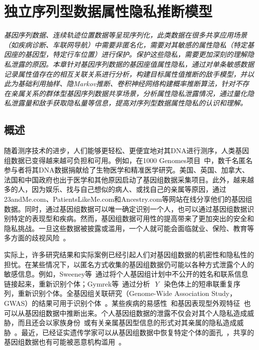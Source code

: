 \chapter{独立序列型数据属性隐私推断模型}
\label{chap:inference-attack-on-norelated-sequenced-data}

\textit{ }

\textit{基因序列数据、连续轨迹位置数据等呈现序列化，此类数据在很多共享应用场景（如疾病诊断、车联网导航）中需要非匿名化，需要对其敏感的属性隐私（特定基因座的基因型，特定行车位置）进行保护。保护这些隐私，需要更加深刻的理解隐私泄露的原因。本章针对基因序列数据的基因座值属性隐私，通过对单条敏感数据记录属性值存在的相互关联关系进行分析，构建目标属性值推断的敌手模型，并以此为基础利用抽样、隐Markov推断、卷积神经网络构建概率推断算法，针对不存在亲属关系的群体型基因序列数据共享场景，分析属性隐私泄露情况，通过量化隐私泄露量和敌手获取隐私量等信息，提高对序列型数据属性隐私的认识和理解。
}

\section{概述}\label{sec:intro}

随着测序技术的进步，人们能够更轻松、更便宜地对其DNA进行测序，人类基因组数据已变得越来越可负担和可用。例如，在1000 Genomes项目~\cite{gpc2015global}中，数千名匿名参与者将其DNA数据捐献给了生物医学和精准医学研究。美国、英国、加拿大、法国和中国政府也出于医学和其他原因启动了基因组数据采集项目。此外，越来越多的人，因为娱乐、找与自己想似的病人、或找自己的亲属等原因，通过23andMe.com、PatientsLikeMe.com和Ancestry.com等网站在线分享他们的基因组数据。同时，通过基因组数据可以唯一确定识别一个人，也可以通过基因组数据识别特定的表现型和疾病。然而，基因组数据可用性的提高带来了更加突出的安全和隐私挑战。一旦这些数据被披露或滥用，一个人就可能会面临就业、保险、教育等多方面的歧视风险~\cite{eeoc2008genetic}。

实际上，许多研究结果和实际案例已经引起人们对基因组数据的机密性和隐私性的担忧。在某些情况下，以匿名方式收集的基因组数据仍可能以各种方式泄露个人的敏感信息。例如，Sweeney等~\cite{sweeney2013identifying}通过将个人基因组计划中不公开的姓名和联系信息链接起来，重新识别个体；Gymrek等~\cite{gymrek2013identifying}通过分析~$~Y~$~染色体上的短串联重复序列，重新识别个体。全基因组关联研究（Genome-Wide Association Study，GWAS）的结果可用于识别个体~\cite{cai2015deterministic}。某些疾病的易感性~\cite{shringarpure2015privacy}和基因表现型外观特征~\cite{walsh2011irisplex}也可以从基因组数据中推断出来。个人基因组数据的泄露不仅会对其个人隐私造成威胁，而且还会以家族身份~\cite{rohlfs2012familial}或有关亲属基因型信息的形式对其亲属的隐私造成威胁~\cite{humbert2013addressing}。最近，已经证实遗传学家可以从基因组数据中恢复特定个体的面孔~\cite{hess2017controversial}，共享的基因组数据也有可能被恶意机构滥用~\cite{scutti2018what}。

